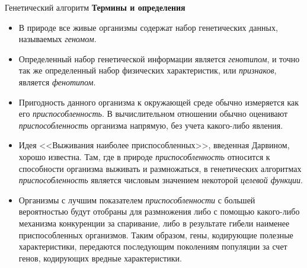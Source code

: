 \documentclass[aspectratio=169, mathserif]{beamer}	%
\begin{document}
\begin{frame}[fragile]{Генетический алгоритм}
\scriptsize
\alert{\textbf{Термины и определения}}
\begin{itemize}
	\item В природе все живые организмы содержат набор генетических данных, называемых \textcolor{extraorange}{\textit{геномом}}.
	\item Определенный набор генетической информации является \textcolor{extraorange}{\textit{генотипом}}, и точно так же определенный набор физических характеристик, или \textcolor{extraorange}{\textit{признаков}}, является \textcolor{extraorange}{\textit{фенотипом}}.
	\item Пригодность данного организма к окружающей среде обычно измеряется как его \textcolor{extraorange}{\textit{приспособленность}}. В вычислительном отношении обычно оценивают \textcolor{extraorange}{\textit{приспособленность}} организма напрямую, без учета какого-либо явления.
	\item Идея <<Выживания наиболее приспособленных>>, введенная Дарвином, хорошо известна. Там, где в природе \textcolor{extraorange}{\textit{приспособленность}} относится к способности организма выживать и размножаться, в генетических алгоритмах \textcolor{extraorange}{\textit{приспособленность}} является числовым значением некоторой \textcolor{extraorange}{\textit{целевой функции}}.
	\item Организмы с лучшим показателем \textcolor{extraorange}{\textit{приспособленности}} с большей вероятностью будут отобраны для размножения либо с помощью какого-либо механизма конкуренции за спаривание, либо в результате гибели наименее приспособленных организмов. Таким образом, гены, кодирующие полезные характеристики, передаются последующим поколениям популяции за счет генов, кодирующих вредные характеристики.
\end{itemize}
\vfill
\end{frame}
\end{document}
